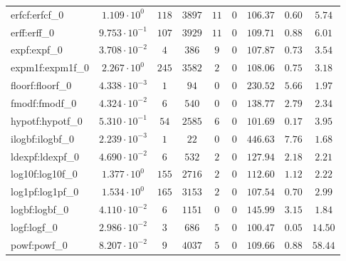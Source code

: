 \begin{tabular}{|l|c|c|c|c|c|c|c|c|}
erfcf:erfcf\_0               & $ 1.109 \cdot 10^{0}  $ & $ 118    $ & $ 3897   $ & $ 11  $ & $ 0   $ & $ 106.37      $ & $ 0.60    $ & $ 5.74    $ \\
erff:erff\_0                 & $ 9.753 \cdot 10^{-1} $ & $ 107    $ & $ 3929   $ & $ 11  $ & $ 0   $ & $ 109.71      $ & $ 0.88    $ & $ 6.01    $ \\
expf:expf\_0                 & $ 3.708 \cdot 10^{-2} $ & $ 4      $ & $ 386    $ & $ 9   $ & $ 0   $ & $ 107.87      $ & $ 0.73    $ & $ 3.54    $ \\
expm1f:expm1f\_0             & $ 2.267 \cdot 10^{0}  $ & $ 245    $ & $ 3582   $ & $ 2   $ & $ 0   $ & $ 108.06      $ & $ 0.75    $ & $ 3.18    $ \\
floorf:floorf\_0             & $ 4.338 \cdot 10^{-3} $ & $ 1      $ & $ 94     $ & $ 0   $ & $ 0   $ & $ 230.52      $ & $ 5.66    $ & $ 1.97    $ \\
fmodf:fmodf\_0               & $ 4.324 \cdot 10^{-2} $ & $ 6      $ & $ 540    $ & $ 0   $ & $ 0   $ & $ 138.77      $ & $ 2.79    $ & $ 2.34    $ \\
hypotf:hypotf\_0             & $ 5.310 \cdot 10^{-1} $ & $ 54     $ & $ 2585   $ & $ 6   $ & $ 0   $ & $ 101.69      $ & $ 0.17    $ & $ 3.95    $ \\
ilogbf:ilogbf\_0             & $ 2.239 \cdot 10^{-3} $ & $ 1      $ & $ 22     $ & $ 0   $ & $ 0   $ & $ 446.63      $ & $ 7.76    $ & $ 1.68    $ \\
ldexpf:ldexpf\_0             & $ 4.690 \cdot 10^{-2} $ & $ 6      $ & $ 532    $ & $ 2   $ & $ 0   $ & $ 127.94      $ & $ 2.18    $ & $ 2.21    $ \\
log10f:log10f\_0             & $ 1.377 \cdot 10^{0}  $ & $ 155    $ & $ 2716   $ & $ 2   $ & $ 0   $ & $ 112.60      $ & $ 1.12    $ & $ 2.22    $ \\
log1pf:log1pf\_0             & $ 1.534 \cdot 10^{0}  $ & $ 165    $ & $ 3153   $ & $ 2   $ & $ 0   $ & $ 107.54      $ & $ 0.70    $ & $ 2.99    $ \\
logbf:logbf\_0               & $ 4.110 \cdot 10^{-2} $ & $ 6      $ & $ 1151   $ & $ 0   $ & $ 0   $ & $ 145.99      $ & $ 3.15    $ & $ 1.84    $ \\
logf:logf\_0                 & $ 2.986 \cdot 10^{-2} $ & $ 3      $ & $ 686    $ & $ 5   $ & $ 0   $ & $ 100.47      $ & $ 0.05    $ & $ 14.50   $ \\
powf:powf\_0                 & $ 8.207 \cdot 10^{-2} $ & $ 9      $ & $ 4037   $ & $ 5   $ & $ 0   $ & $ 109.66      $ & $ 0.88    $ & $ 58.44   $ \\

\end{tabular}
